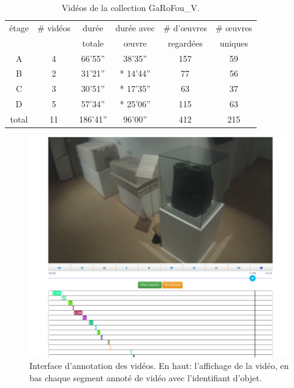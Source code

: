 \begin{table}[htb]
    \centering
    \begin{tabular}{| c | c | c | c | c | c |}
    \hline 
    étage & \# vidéos & durée  & durée avec & \# d'œuvres & \# œuvres  \\
      	  &           & totale & œuvre      & regardées   & uniques 	   \\
    \hline    
    \hline    
    A & 4 & 66'55''  & 38'35'' & 157 & 59\\
    B & 2 & 31'21''  & * 14'44'' & 77 & 56\\
    C & 3 & 30'51''  & * 17'35'' & 63 & 37\\
    D & 5 & 57'34''  & * 25'06'' & 115 & 63\\
    \hline    
    \hline    
  	total & 11 & 186'41'' & 96'00'' & 412 & 215 \\
    \hline
    \end{tabular}
    \caption{Vidéos de la collection GaRoFou\_V.}
    \label{tab:video_garofou}
\end{table}

\begin{figure}
\centering
    \includegraphics[width=0.9\linewidth]{figures/annotation.png}
    \caption{Interface d'annotation des vidéos. En haut: l'affichage de la vidéo, en bas chaque segment annoté de vidéo avec l'identifiant d'objet.}
   \label{fig:annotation}
\end{figure}

